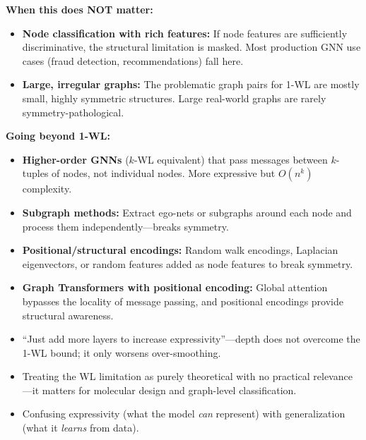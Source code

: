 \begin{interviewq}
\textbf{When this does NOT matter:}
\begin{itemize}
    \item \textbf{Node classification with rich features:} If node features are sufficiently discriminative, the structural limitation is masked. Most production GNN use cases (fraud detection, recommendations) fall here.
    \item \textbf{Large, irregular graphs:} The problematic graph pairs for 1-WL are mostly small, highly symmetric structures. Large real-world graphs are rarely symmetry-pathological.
\end{itemize}

\textbf{Going beyond 1-WL:}
\begin{itemize}
    \item \textbf{Higher-order GNNs} ($k$-WL equivalent) that pass messages between $k$-tuples of nodes, not individual nodes. More expressive but $O(n^k)$ complexity.
    \item \textbf{Subgraph methods:} Extract ego-nets or subgraphs around each node and process them independently---breaks symmetry.
    \item \textbf{Positional/structural encodings:} Random walk encodings, Laplacian eigenvectors, or random features added as node features to break symmetry.
    \item \textbf{Graph Transformers with positional encoding:} Global attention bypasses the locality of message passing, and positional encodings provide structural awareness.
\end{itemize}

\redflags
\begin{itemize}
    \item ``Just add more layers to increase expressivity''---depth does not overcome the 1-WL bound; it only worsens over-smoothing.
    \item Treating the WL limitation as purely theoretical with no practical relevance---it matters for molecular design and graph-level classification.
    \item Confusing expressivity (what the model \textit{can} represent) with generalization (what it \textit{learns} from data).
\end{itemize}



\end{interviewq}
